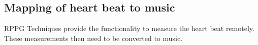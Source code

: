 


















\subsection{Mapping of heart beat to music}


RPPG Techniques provide the functionality to measure the heart beat remotely. These measurements then need to be converted to music.

